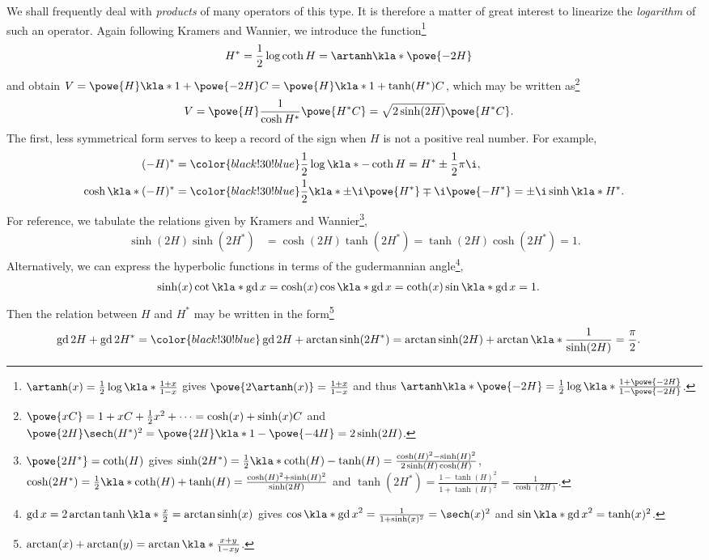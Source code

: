 \documentclass[english, parskip=full]{scrartcl}
\newcommand{\note}[1]{\bgroup\color{black!30!blue}#1\egroup}
\DeclareMathOperator{\gd}{gd}
\begin{document}
We shall frequently deal with \emph{products} of many operators of this type.
It is therefore a matter of great interest to linearize the \emph{logarithm} of such an operator.
Again following Kramers and Wannier, we introduce the function\footnote{\note{$\artanh(x) = \frac{1}{2}\log\kla*{\frac{1+x}{1-x}}$ gives $\powe{2\artanh(x)} = \frac{1+x}{1-x}$ and thus $\artanh\kla*{\powe{-2H}} = \frac{1}{2} \log \kla*{\frac{1+\powe{-2H}}{1 - \powe{-2H}}}$.}}
\begin{align}
H^\ast &= \frac{1}{2} \log\coth H = \artanh\kla*{\powe{-2H}}
\end{align}
and obtain $V=\powe{H}\kla*{1 + \powe{-2H}C} = \powe{H} \kla*{1 + \tanh (H^\ast)C}$, which may be written as\footnote{\note{$\powe{xC} = 1 + xC + \frac{1}{2}x^2 + \dots = \cosh(x) + \sinh(x)C$ and $\powe{2H} \sech(H^\ast)^2 = \powe{2H} \kla*{1 - \powe{-4H}} = 2\sinh(2H)$.}}
\begin{align}
V &= \powe{H} \frac{1}{\cosh H^\ast} \powe{H^\ast C} = \sqrt{2\sinh(2H)} \powe{H^\ast C}.
\end{align}
The first, less symmetrical form serves to keep a record of the sign when $H$ is not a positive real number.
For example,
\begin{align}
(-H)^\ast &= \note{ \frac{1}{2} \log \kla*{-\coth H} }= H^\ast \pm \frac{1}{2} \pi\i,\\
\cosh\kla*{(-H)^\ast} &= \note{\frac{1}{2} \kla*{\pm\i \powe{H^\ast} \mp \i \powe{-H^\ast}} } = \pm \i\sinh\kla*{H^\ast}.
\end{align}
For reference, we tabulate the relations given by Kramers and Wannier\footnote{\note{$\powe{2H^\ast} = \coth(H)$ gives $\sinh(2H^\ast) = \frac{1}{2}\kla*{\coth(H) - \tanh(H)} = \frac{\cosh(H)^2 - \sinh(H)^2}{2\sinh(H)\cosh(H)}$, $\cosh(2H^\ast) = \frac{1}{2} \kla*{\coth(H) + \tanh(H)} = \frac{\cosh(H)^2 + \sinh(H)^2}{\sinh(2H)}$ and $\tanh(2H^\ast) = \frac{1 - \tanh(H)^2}{1 + \tanh(H)^2} = \frac{1}{\cosh(2H)}$.}},
\begin{align}
\sinh(2H) \sinh(2H^\ast) &= \cosh(2H) \tanh(2H^\ast) = \tanh(2H) \cosh(2H^\ast) = 1.
\end{align}
Alternatively, we can express the hyperbolic functions in terms of the gudermannian angle\footnote{\note{$\gd x = 2\arctan \tanh\kla*{\frac{x}{2}} = \arctan\sinh(x)$ gives $\cos\kla*{\gd x}^2 = \frac{1}{1+\sinh(x)^2} = \sech(x)^2$ and $\sin\kla*{\gd x}^2 = \tanh(x)^2$.}},
\begin{align}
\sinh (x) \cot\kla*{\gd x} &= \cosh(x)\cos\kla*{\gd x} = \coth(x) \sin\kla*{\gd x} = 1.
\end{align}
Then the relation between $H$ and $H^\ast$ may be written in the form\footnote{\note{$\arctan(x) + \arctan(y) = \arctan\kla*{\frac{x+y}{1-xy}}$.}}
\begin{align}
\gd 2H + \gd 2H^\ast &= \note{\gd 2H + \arctan\sinh(2H^\ast) = \arctan\sinh(2H) + \arctan\kla*{\frac{1}{\sinh(2H)}}} = \frac{\pi}{2}.
\end{align}
\end{document}
